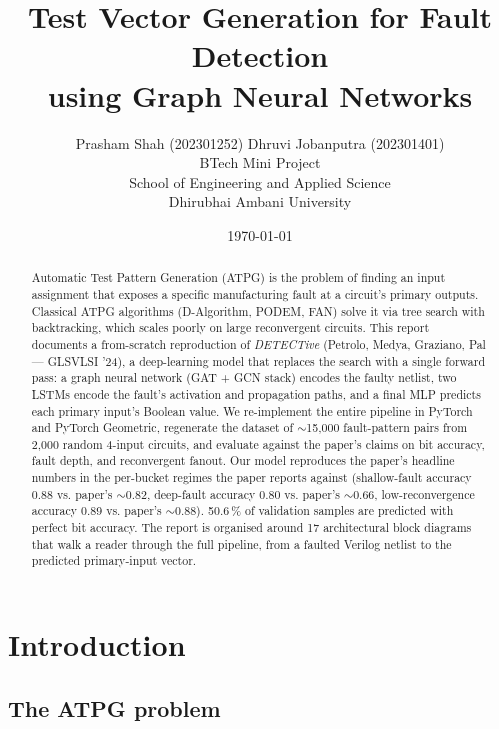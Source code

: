 \documentclass[11pt,a4paper]{article}
\title{\bfseries Test Vector Generation for Fault Detection\\
using Graph Neural Networks}
\author{Prasham Shah (202301252) \quad Dhruvi Jobanputra (202301401)\\[4pt]
\small BTech Mini Project\\
\small School of Engineering and Applied Science\\
\small Dhirubhai Ambani University}
\date{\today}
\begin{document}
\maketitle

\begin{abstract}
\noindent
Automatic Test Pattern Generation (ATPG) is the problem of finding an input
assignment that exposes a specific manufacturing fault at a circuit's
primary outputs. Classical ATPG algorithms (D-Algorithm, PODEM, FAN) solve
it via tree search with backtracking, which scales poorly on large
reconvergent circuits. This report documents a from-scratch reproduction
of \emph{DETECTive} (Petrolo, Medya, Graziano, Pal --- GLSVLSI '24), a
deep-learning model that replaces the search with a single forward pass: a
graph neural network (GAT + GCN stack) encodes the faulty netlist, two
LSTMs encode the fault's activation and propagation paths, and a final MLP
predicts each primary input's Boolean value. We re-implement the entire
pipeline in PyTorch and PyTorch Geometric, regenerate the dataset of
$\sim$15{,}000 fault-pattern pairs from 2{,}000 random 4-input circuits, and
evaluate against the paper's claims on bit accuracy, fault depth, and
reconvergent fanout. Our model reproduces the paper's headline numbers in
the per-bucket regimes the paper reports against
(shallow-fault accuracy 0.88 vs. paper's $\sim$0.82, deep-fault accuracy
0.80 vs. paper's $\sim$0.66, low-reconvergence accuracy 0.89 vs. paper's
$\sim$0.88). 50.6\,\% of validation samples are predicted with perfect
bit accuracy. The report is organised around 17 architectural block
diagrams that walk a reader through the full pipeline, from a faulted
Verilog netlist to the predicted primary-input vector.
\end{abstract}

\tableofcontents
\bigskip

\section{Introduction}
\label{sec:intro}

\subsection{The ATPG problem}
\end{document}
